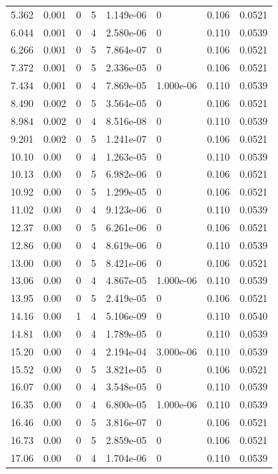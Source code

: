 \documentclass[preview]{standalone}
\begin{document}
{{\begin{tabular}{L{1.2cm}C{1.2cm} C{0.3cm}C{0.5cm} C{1.4cm}C{1.4cm} C{1.4cm}C{1.4cm}}
  5.362  &  0.001  & 0     &  5 &  1.149e-06  & 0  & 0.106 &  0.0521   \\ 
  6.044  &  0.001  & 0     &  4 &  2.580e-06  & 0  & 0.110 &  0.0539   \\ 
  6.266  &  0.001  & 0     &  5 &  7.864e-07  & 0  & 0.106 &  0.0521   \\ 
  7.372  &  0.001  & 0     &  5 &  2.336e-05  & 0  & 0.106 &  0.0521   \\ 
  7.434  &  0.001  & 0     &  4 &  7.869e-05  & 1.000e-06  & 0.110 &  0.0539   \\ 
  8.490  &  0.002  & 0     &  5 &  3.564e-05  & 0  & 0.106 &  0.0521   \\ 
  8.984  &  0.002  & 0     &  4 &  8.516e-08  & 0  & 0.110 &  0.0539   \\ 
  9.201  &  0.002  & 0     &  5 &  1.241e-07  & 0  & 0.106 &  0.0521   \\ 
  10.10  &  0.00  & 0     &  4 &  1.263e-05  & 0  & 0.110 &  0.0539   \\ 
  10.13  &  0.00  & 0     &  5 &  6.982e-06  & 0  & 0.106 &  0.0521   \\ 
  10.92  &  0.00  & 0     &  5 &  1.299e-05  & 0  & 0.106 &  0.0521   \\ 
  11.02  &  0.00  & 0     &  4 &  9.123e-06  & 0  & 0.110 &  0.0539   \\ 
  12.37  &  0.00  & 0     &  5 &  6.261e-06  & 0  & 0.106 &  0.0521   \\ 
  12.86  &  0.00  & 0     &  4 &  8.619e-06  & 0  & 0.110 &  0.0539   \\ 
  13.00  &  0.00  & 0     &  5 &  8.421e-06  & 0  & 0.106 &  0.0521   \\ 
  13.06  &  0.00  & 0     &  4 &  4.867e-05  & 1.000e-06  & 0.110 &  0.0539   \\ 
  13.95  &  0.00  & 0     &  5 &  2.419e-05  & 0  & 0.106 &  0.0521   \\ 
  14.16  &  0.00  & 1     &  4 &  5.106e-09  & 0  & 0.110 &  0.0540   \\ 
  14.81  &  0.00  & 0     &  4 &  1.789e-05  & 0  & 0.110 &  0.0539   \\ 
  15.20  &  0.00  & 0     &  4 &  2.194e-04  & 3.000e-06  & 0.110 &  0.0539   \\ 
  15.52  &  0.00  & 0     &  5 &  3.821e-05  & 0  & 0.106 &  0.0521   \\ 
  16.07  &  0.00  & 0     &  4 &  3.548e-05  & 0  & 0.110 &  0.0539   \\ 
  16.35  &  0.00  & 0     &  4 &  6.800e-05  & 1.000e-06  & 0.110 &  0.0539   \\ 
  16.46  &  0.00  & 0     &  5 &  3.816e-07  & 0  & 0.106 &  0.0521   \\ 
  16.73  &  0.00  & 0     &  5 &  2.859e-05  & 0  & 0.106 &  0.0521   \\ 
  17.06  &  0.00  & 0     &  4 &  1.704e-06  & 0  & 0.110 &  0.0539   \\ 
\hline 
\end{tabular} 

}}
\end{document}
